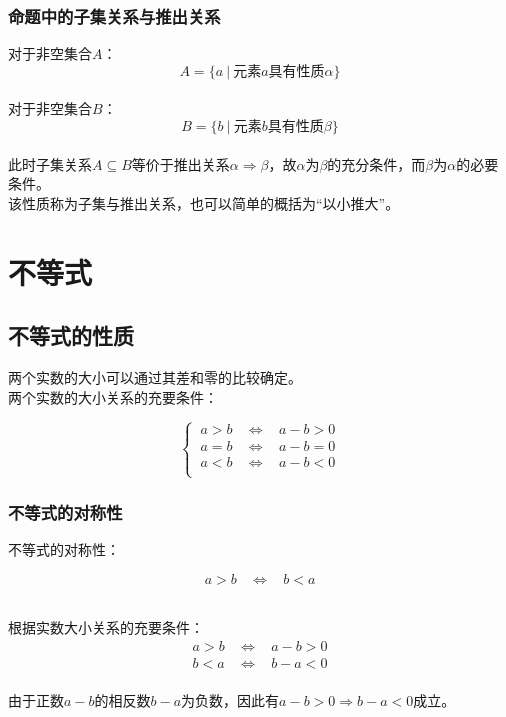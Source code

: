 \documentclass[UTF8]{ctexart}
\begin{document}
\subsubsection{命题中的子集关系与推出关系}
    \setcounter{equation}{0}
    对于非空集合$A$：
    \begin{equation}
        A=\big\{a~|~\text{元素}a\text{具有性质}\alpha\big\}
    \end{equation}\\
    对于非空集合$B$：
    \begin{equation}
        B=\big\{b~|~\text{元素}b\text{具有性质}\beta\big\}
    \end{equation}\\
    此时子集关系$A\subseteq B$等价于推出关系$\alpha\Rightarrow\beta$，故$\alpha$为$\beta$的充分条件，而$\beta$为$\alpha$的必要条件。\\[3mm]
    该性质称为子集与推出关系，也可以简单的概括为“以小推大”。
    

\newpage

\section{不等式}

\subsection{不等式的性质}
    两个实数的大小可以通过其差和零的比较确定。\\[3mm]
    两个实数的大小关系的充要条件：
    \begin{large}
        \begin{equation*}
            \begin{cases}
                ~a>b~~~~\Longleftrightarrow~~~~a-b>0\\[1mm]
                ~a=b~~~~\Longleftrightarrow~~~~a-b=0\\[1mm]
                ~a<b~~~~\Longleftrightarrow~~~~a-b<0\\
            \end{cases}
        \end{equation*}
    \end{large}

\subsubsection{不等式的对称性}
    \setcounter{equation}{0}
    不等式的对称性：
    \begin{large}
        \begin{equation*}
            a>b~~~~\Longleftrightarrow~~~~b<a
        \end{equation*}
    \end{large}\\
    根据实数大小关系的充要条件：
    \begin{align}
        a>b~~~~\Longleftrightarrow~~~~a-b>0\\[3mm]
        b<a~~~~\Longleftrightarrow~~~~b-a<0
    \end{align}\\
    由于正数$a-b$的相反数$b-a$为负数，因此有$a-b>0\Longrightarrow b-a<0$成立。\vspace{8pt}
\end{document}
